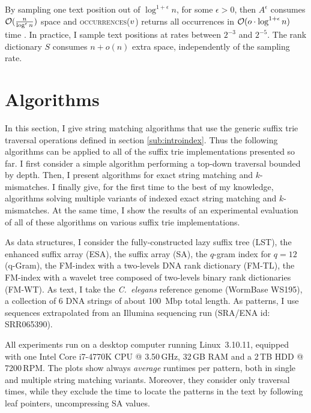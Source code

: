 By sampling one text position out of $\log^{1+\epsilon}{n}$, for some $\epsilon > 0$, then $A^{\epsilon}$ consumes $\mathcal{O}(\frac{n}{\log^{\epsilon}{n}})$ space and \textsc{occurrences}($v$) returns all occurrences in $\mathcal{O}(o \cdot \log^{1+\epsilon}{n})$ time \citep{Ferragina2000}.
In practice, I sample text positions at rates between $2^{-3}$ and $2^{-5}$.
The rank dictionary $S$ consumes $n+o(n)$ extra space, independently of the sampling rate.

\section{Algorithms}
\label{sec:index:algo}

In this section, I give string matching algorithms that use the generic suffix trie traversal operations defined in section \ref{sub:introindex}.
Thus the following algorithms can be applied to all of the suffix trie implementations presented so far.
I first consider a simple algorithm performing a top-down traversal bounded by depth.
Then, I present algorithms for exact string matching and $k$-mismatches.%
I finally give, for the first time to the best of my knowledge, algorithms solving multiple variants of indexed exact string matching and $k$-mismatches.
At the same time, I show the results of an experimental evaluation of all of these algorithms on various suffix trie implementations.

As data structures, I consider the fully-constructed lazy suffix tree (LST), the enhanced suffix array (ESA), the suffix array (SA), the $q$-gram index for $q=12$ (q-Gram), the FM-index with a two-levels DNA rank dictionary (FM-TL), the FM-index with a wavelet tree composed of two-levels binary rank dictionaries (FM-WT).
As text, I take the \emph{C.~elegans} reference genome (WormBase WS195), \ie a collection of 6 DNA strings of about 100~Mbp total length.
As patterns, I use sequences extrapolated from an Illumina sequencing run (SRA/ENA id: SRR065390).

All experiments run on a desktop computer running Linux~3.10.11, equipped with one Intel\textsuperscript{\textregistered} Core i7-4770K CPU @ 3.50\,GHz, 32\,GB RAM and a 2\,TB HDD @ 7200\,RPM.
The plots show always \emph{average} runtimes per pattern, both in single and multiple string matching variants.
Moreover, they consider only traversal times, while they exclude the time to locate the patterns in the text by following leaf pointers, \eg uncompressing SA values.

